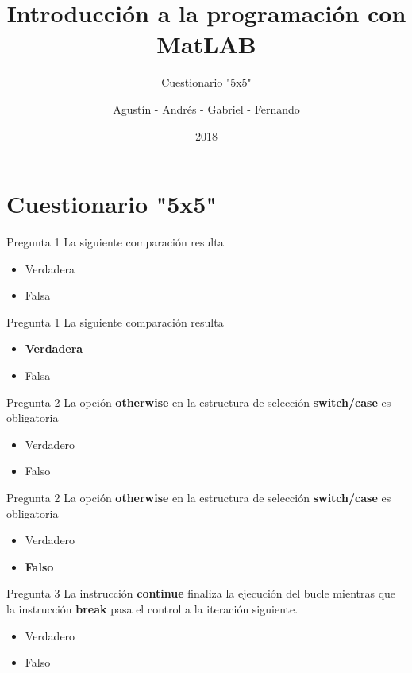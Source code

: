 \documentclass{bredelebeamer}
\title[Programación en MatLAB]{Introducción a la programación con MatLAB}
\subtitle{Cuestionario "5x5"}
\author{Agustín - Andrés - Gabriel - Fernando\inst{1}}
\institute[UTN.BA]
{
  \inst{1}%
  Universidad Tecnológica Nacional\\
  Facultad Regional Buenos Aires
  }
\date{2018}
\begin{document}
\begin{frame}
  \titlepage 
\end{frame}




\section{Cuestionario "5x5"}

\begin{frame}{Pregunta 1}
La siguiente comparación resulta

\begin{itemize}
\item Verdadera
\item Falsa
\end{itemize}
\end{frame}

\begin{frame}{Pregunta 1}
La siguiente comparación resulta

\begin{itemize}
\item \textbf{Verdadera}
\item Falsa
\end{itemize}
\end{frame}

\begin{frame}{Pregunta 2}
La opción \textbf{otherwise} en la estructura de selección \textbf{switch/case} es obligatoria
\begin{itemize}
\item Verdadero
\item Falso
\end{itemize}
\end{frame}

\begin{frame}{Pregunta 2}
La opción \textbf{otherwise} en la estructura de selección \textbf{switch/case} es obligatoria
\begin{itemize}
\item Verdadero
\item \textbf{Falso}
\end{itemize}
\end{frame}

\begin{frame}{Pregunta 3}
La instrucción \textbf{continue} finaliza la ejecución del bucle mientras que la instrucción \textbf{break} pasa el control a la iteración siguiente.
\begin{itemize}
\item Verdadero
\item Falso
\end{itemize}
\end{frame}
\end{document}
